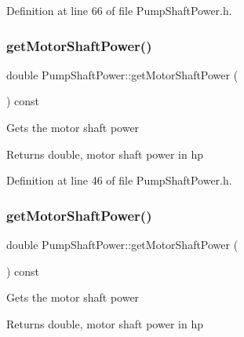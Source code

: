 Definition at line 66 of file Pump\+Shaft\+Power.\+h.

\mbox{\label{class_pump_shaft_power_acb91eadb960f946ffee5373d4839a5be}} 
\subsubsection{\texorpdfstring{get\+Motor\+Shaft\+Power()}{getMotorShaftPower()}\hspace{0.1cm}{\footnotesize\ttfamily [1/3]}}
{\footnotesize\ttfamily double Pump\+Shaft\+Power\+::get\+Motor\+Shaft\+Power (\begin{DoxyParamCaption}{ }\end{DoxyParamCaption}) const\hspace{0.3cm}{\ttfamily [inline]}}

Gets the motor shaft power

\begin{DoxyReturn}{Returns}
double, motor shaft power in hp 
\end{DoxyReturn}


Definition at line 46 of file Pump\+Shaft\+Power.\+h.

\mbox{\label{class_pump_shaft_power_acb91eadb960f946ffee5373d4839a5be}} 
\subsubsection{\texorpdfstring{get\+Motor\+Shaft\+Power()}{getMotorShaftPower()}\hspace{0.1cm}{\footnotesize\ttfamily [2/3]}}
{\footnotesize\ttfamily double Pump\+Shaft\+Power\+::get\+Motor\+Shaft\+Power (\begin{DoxyParamCaption}{ }\end{DoxyParamCaption}) const\hspace{0.3cm}{\ttfamily [inline]}}

Gets the motor shaft power

\begin{DoxyReturn}{Returns}
double, motor shaft power in hp 
\end{DoxyReturn}


